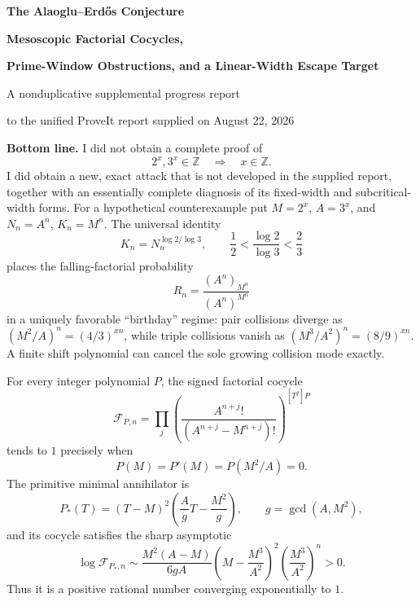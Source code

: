 \documentclass[11pt,oneside]{article}
\theoremstyle{definition}
\theoremstyle{remark}
\newcommand{\Z}{\mathbb Z}
\newcommand{\cF}{\mathcal F}
\begin{document}
\hypersetup{pageanchor=false}

\begin{titlepage}
\centering
\vspace*{0.65cm}
{\Huge\bfseries The Alaoglu--Erd\H{o}s Conjecture\par}
\vspace{0.28cm}
{\LARGE\bfseries Mesoscopic Factorial Cocycles,\par}
\vspace{0.12cm}
{\LARGE\bfseries Prime-Window Obstructions, and a Linear-Width Escape Target\par}
\vspace{0.85cm}
{\large A nonduplicative supplemental progress report\par}
\vspace{0.1cm}
{\large to the unified ProveIt report supplied on August 22, 2026\par}
\vfill
\begin{minipage}{0.91\textwidth}
\small
\textbf{Bottom line.}
I did not obtain a complete proof of
\[
 2^x,3^x\in\Z\quad\Longrightarrow\quad x\in\Z.
\]
I did obtain a new, exact attack that is not developed in the supplied report, together with
an essentially complete diagnosis of its fixed-width and subcritical-width forms.
For a hypothetical counterexample put $M=2^x$, $A=3^x$, and
$N_n=A^n$, $K_n=M^n$.  The universal identity
\[
 K_n=N_n^{\log 2/\log 3},\qquad
 \frac12<\frac{\log2}{\log3}<\frac23
\]
places the falling-factorial probability
\[
 R_n=\frac{(A^n)_{M^n}}{(A^n)^{M^n}}
\]
in a uniquely favorable ``birthday'' regime: pair collisions diverge as
$(M^2/A)^n=(4/3)^{xn}$, while triple collisions vanish as
$(M^3/A^2)^n=(8/9)^{xn}$.  A finite shift polynomial can cancel the sole growing
collision mode exactly.

For every integer polynomial $P$, the signed factorial cocycle
\[
 \cF_{P,n}=\prod_j\left(\frac{A^{n+j}!}{(A^{n+j}-M^{n+j})!}\right)^{[T^j]P}
\]
tends to $1$ precisely when
\[
 P(M)=P'(M)=P(M^2/A)=0.
\]
The primitive minimal annihilator is
\[
 P_*(T)=(T-M)^2\left(\frac{A}{g}T-\frac{M^2}{g}\right),
 \qquad g=\gcd(A,M^2),
\]
and its cocycle satisfies the sharp asymptotic
\[
 \log\cF_{P_*,n}\sim
 \frac{M^2(A-M)}{6gA}
 \left(M-\frac{M^3}{A^2}\right)^2
 \left(\frac{M^3}{A^2}\right)^n>0.
\]
Thus it is a positive rational number converging exponentially to $1$.


\end{minipage}
\end{titlepage}
\end{document}
